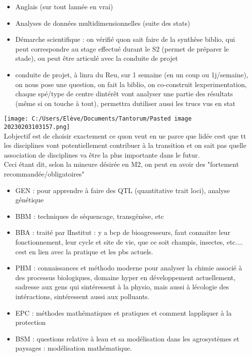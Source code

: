 \documentclass[
]{article}
\providecommand{\tightlist}{%
  \setlength{\itemsep}{0pt}\setlength{\parskip}{0pt}}
\begin{document}
\begin{itemize}
\tightlist
\item
  Anglais (sur tout l\textquotesingle année en vrai)
\item
  Analyses de données multidimensionnelles (suite des stats)
\item
  Démarche scientifique : on vérifié qu\textquotesingle on sait faire de
  la synthèse biblio, qui peut correspondre au stage effectué durant le
  S2 (permet de préparer le stade), ou peut être articulé avec la
  conduite de projet
\item
  conduite de projet, à l\textquotesingle inra du Reu, sur 1 semaine (en
  un coup ou 1j/semaine), on nous pose une question, on fait la biblio,
  on co-construit l\textquotesingle experimentation, chaque spé/type de
  centre d\textquotesingle intérêt vont analyser une partie des
  résultats (même si on touche à tout), permettra
  d\textquotesingle utiliser aussi les trucs vus en stat
\end{itemize}

\texttt{[image: C:/Users/Elève/Documents/Tantorum/Pasted image 20230203103157.png]}\\
L\textquotesingle objectif est de choisir exactement ce
qu\textquotesingle on veut en ue parce que l\textquotesingle idée
c\textquotesingle est que tt les disciplines vont potentiellement
contribuer à la transition et on sait pas quelle association de
disciplines va être la plus importante dans le futur.\\
Ceci étant dit, selon la mineure désirée en M2, on peut en avoir des
"fortement recommandée/obligatoires"

\begin{itemize}
\tightlist
\item
  GEN : pour apprendre à faire des QTL (quantitative trait loci),
  analyse génétique
\item
  BBM : techniques de séquencage, transgénèse, etc
\item
  BBA : traité par l\textquotesingle Institut : y a bcp de
  bioagresseurs, faut connaitre leur fonctionnement, leur cycle et site
  de vie, que ce soit champis, insectes, etc.... c\textquotesingle est
  en lien avec la pratique et les pbs actuels.
\item
  PHM : connaissances et méthodo moderne pour analyser la chimie associé
  à des processus biologiques, domaine hyper en développement
  actuellement, s\textquotesingle adresse aux gens qui
  s\textquotesingle intéressent à la physio, mais aussi à
  l\textquotesingle écologie des intéractions,
  s\textquotesingle intéressent aussi aux polluants.
\item
  EPC : méthodes mathématiques et pratiques et comment
  l\textquotesingle appliquer à la protection
\item
  BSM : questions relative à l\textquotesingle eau et sa modélisation
  dans les agrosystèmes et paysages : modélisation mathématique.
\end{itemize}
\end{document}
